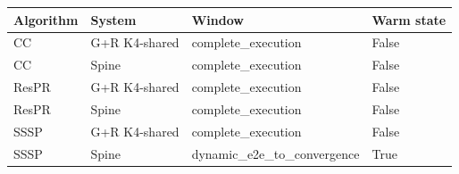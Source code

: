 \begin{tabular}{llll}
\toprule
Algorithm & System & Window & Warm state \\
\midrule
CC & G+R K4-shared & complete\_execution & False \\
CC & Spine & complete\_execution & False \\
ResPR & G+R K4-shared & complete\_execution & False \\
ResPR & Spine & complete\_execution & False \\
SSSP & G+R K4-shared & complete\_execution & False \\
SSSP & Spine & dynamic\_e2e\_to\_convergence & True \\
\bottomrule
\end{tabular}
